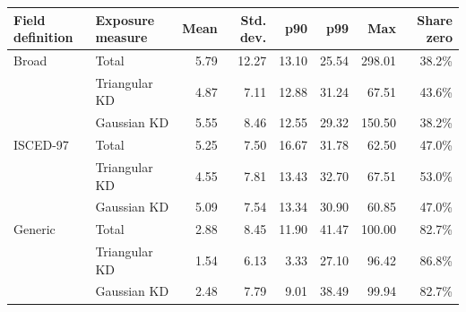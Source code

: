 \begin{tabular}{llrrrrrr}
\toprule
Field definition & Exposure measure & Mean & Std. dev. & p90 & p99 & Max & Share zero \\
\midrule
Broad & Total &   5.79 &  12.27 &  13.10 &  25.54 & 298.01 &  38.2\% \\
 & Triangular KD &   4.87 &   7.11 &  12.88 &  31.24 &  67.51 &  43.6\% \\
 & Gaussian KD &   5.55 &   8.46 &  12.55 &  29.32 & 150.50 &  38.2\% \\
\addlinespace
ISCED-97 & Total &   5.25 &   7.50 &  16.67 &  31.78 &  62.50 &  47.0\% \\
 & Triangular KD &   4.55 &   7.81 &  13.43 &  32.70 &  67.51 &  53.0\% \\
 & Gaussian KD &   5.09 &   7.54 &  13.34 &  30.90 &  60.85 &  47.0\% \\
\addlinespace
Generic & Total &   2.88 &   8.45 &  11.90 &  41.47 & 100.00 &  82.7\% \\
 & Triangular KD &   1.54 &   6.13 &   3.33 &  27.10 &  96.42 &  86.8\% \\
 & Gaussian KD &   2.48 &   7.79 &   9.01 &  38.49 &  99.94 &  82.7\% \\
\bottomrule
\end{tabular}
